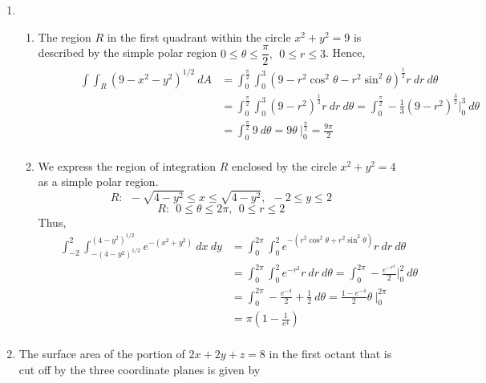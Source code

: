 \documentclass[12pt]{amsart}
\begin{document}
\begin{enumerate}
	\item 
			
			\begin{enumerate}
		
			\item The region $R$ in the first quadrant within the circle $x^2+y^2=9$ is described by the simple polar region
				$0 \le \theta \le \dfrac{\pi}{2}, \ \ 0 \le r \le 3$.  Hence,
				\begin{align*}
					\ \ \ \ \ \ \ \ \ \ \ \ \ \ \ \int \int_R (9-x^2-y^2)^{1/2} \ dA &= \int^{\frac{\pi}{2}}_0 \int^3_0 \left(9-r^2\cos^2\theta-r^2\sin^2\theta\right)^{\frac{1}{2}}r \ dr \ d\theta \\
					&=\int^{\frac{\pi}{2}}_0 \int^3_0 \left(9-r^2\right)^{\frac{1}{2}}r \ dr \ d\theta = \int^{\frac{\pi}{2}}_0 -\frac{1}{3} \left(9-r^2\right)^{\frac{3}{2}} \bigg|^3_0 \ d\theta\\
					&=\int^{\frac{\pi}{2}}_0 9 \ d\theta = 9\theta \ \bigg|^{\frac{\pi}{2}}_0 = \frac{9\pi}{2} \\
				\end{align*}
			
			\item We express the region of integration $R$ enclosed by the circle $x^2+y^2=4$ as a simple polar region.
				$$R: \ \ -\sqrt{4-y^2} \le x \le \sqrt{4-y^2}, \ \ -2 \le y \le 2$$
				$$R: \ \ 0 \le \theta \le 2\pi, \ \ 0 \le r \le 2$$
				Thus,
				\begin{align*}
					\ \ \ \ \ \ \ \int^2_{-2} \int^{(4-y^2)^{1/2}}_{-(4-y^2)^{1/2}} e^{-(x^2+y^2)} \ dx \ dy &= \int^{2\pi}_0 \int^2_0 e^{-(r^2\cos^2\theta+r^2\sin^2\theta)}r \ dr \ d\theta \\
					&=\int^{2\pi}_0 \int^2_0 e^{-r^2}r \ dr \ d\theta = \int^{2\pi}_0 -\frac{e^{-r^2}}{2} \bigg|^2_0 \ d\theta\\
					&=\int^{2\pi}_0 -\frac{e^{-4}}{2}+\frac{1}{2} \ d\theta = \frac{1-e^{-4}}{2}\theta \ \bigg|^{2\pi}_0 \\
					&=\pi\left(1-\frac{1}{e^{4}}\right) \\
				\end{align*}
			
		\end{enumerate}
	
	\item The surface area of the portion of $2x+2y+z=8$ in the first octant that is cut off by the three coordinate planes is given by
		\begin{align*}
			&
		\end{align*}
		
\end{enumerate}
\end{document}
